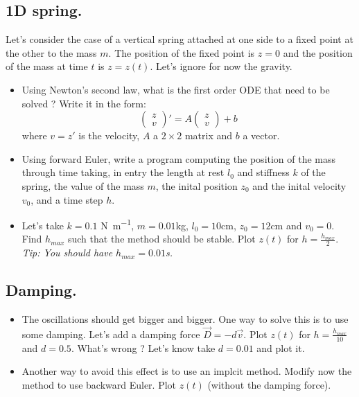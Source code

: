 \subsection{1D spring.} Let's consider the case of a vertical spring attached at one side to a fixed point at the other to the mass $m$. The position of the fixed point is $z = 0$ and the position of the mass at time $t$ is $z = z(t)$. Let's ignore for now the gravity.
\begin{itemize}
\item Using Newton's second law, what is the first order ODE that need to be solved ? Write it in the form:
  $$\left( \begin{matrix} z\\ v \end{matrix} \right) ' = A \left( \begin{matrix} z\\ v \end{matrix} \right) + b$$
  where $v = z'$ is the velocity, $A$ a $2 \times 2$ matrix and $b$ a vector.
\end{itemize}
\hspace{1cm}
\begin{itemize}
\item Using forward Euler, write a program computing the position of the mass through time taking, in entry the length at rest $l_0$ and stiffness $k$ of the spring, the value of the mass $m$, the inital position $z_0$ and the inital velocity $v_0$, and a time step $h$.
\item Let's take $k = 0.1$ \si{N.m^{-1}}, $m = 0.01$\si{kg}, $l_0 = 10$\si{cm}, $z_0 = 12$\si{cm} and $v_0 = 0$. Find $h_{max}$ such that the method should be stable. Plot $z(t)$ for $h = \frac{h_{max}}{2}$. \\
  \textit{Tip: You should have $h_{max} = 0.01$\si{s}.}
\end{itemize}

\subsection{Damping.}
  \begin{itemize}
\item The oscillations should get bigger and bigger. One way to solve this is to use some damping. Let's add a damping force $\vec{D} = -d\vec{v}$. Plot $z(t)$ for $h = \frac{h_{max}}{10}$ and  $d = 0.5$. What's wrong ? Let's know take $d = 0.01$ and plot it.
  \item Another way to avoid this effect is to use an implcit method. Modify now the method to use backward Euler. Plot $z(t)$ (without the damping force).
\end{itemize}


